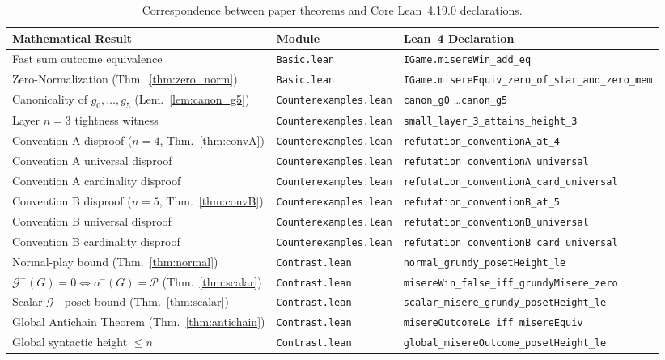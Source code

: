 \documentclass[11pt]{amsart}
\theoremstyle{definition}
\theoremstyle{remark}
\newcommand{\Ppos}{\mathcal{P}}
\newcommand{\Glayer}{\mathcal{G}}
\begin{document}
\begin{table}[ht]
\centering
\caption{Correspondence between paper theorems and Core Lean~4.19.0 declarations.}
\label{tab:lean}
\scriptsize
\setlength{\tabcolsep}{4pt}
\begin{tabular}{@{}lll@{}}
\toprule
Mathematical Result & Module & Lean~4 Declaration \\
\midrule
Fast sum outcome equivalence & \texttt{Basic.lean} & \texttt{IGame.misereWin\_add\_eq} \\
Zero-Normalization (Thm.~\ref{thm:zero_norm}) & \texttt{Basic.lean} & \texttt{IGame.misereEquiv\_zero\_of\_star\_and\_zero\_mem} \\
Canonicality of $g_0, \dots, g_5$ (Lem.~\ref{lem:canon_g5}) & \texttt{Counterexamples.lean} & \texttt{canon\_g0} \dots \texttt{canon\_g5} \\
Layer $n=3$ tightness witness & \texttt{Counterexamples.lean} & \texttt{small\_layer\_3\_attains\_height\_3} \\
Convention A disproof ($n=4$, Thm.~\ref{thm:convA}) & \texttt{Counterexamples.lean} & \texttt{refutation\_conventionA\_at\_4} \\
Convention A universal disproof & \texttt{Counterexamples.lean} & \texttt{refutation\_conventionA\_universal} \\
Convention A cardinality disproof & \texttt{Counterexamples.lean} & \texttt{refutation\_conventionA\_card\_universal} \\
Convention B disproof ($n=5$, Thm.~\ref{thm:convB}) & \texttt{Counterexamples.lean} & \texttt{refutation\_conventionB\_at\_5} \\
Convention B universal disproof & \texttt{Counterexamples.lean} & \texttt{refutation\_conventionB\_universal} \\
Convention B cardinality disproof & \texttt{Counterexamples.lean} & \texttt{refutation\_conventionB\_card\_universal} \\
Normal-play bound (Thm.~\ref{thm:normal}) & \texttt{Contrast.lean} & \texttt{normal\_grundy\_posetHeight\_le} \\
$\Glayer^-(G) = 0 \iff o^-(G) = \Ppos$ (Thm.~\ref{thm:scalar}) & \texttt{Contrast.lean} & \texttt{misereWin\_false\_iff\_grundyMisere\_zero} \\
Scalar $\Glayer^-$ poset bound (Thm.~\ref{thm:scalar}) & \texttt{Contrast.lean} & \texttt{scalar\_misere\_grundy\_posetHeight\_le} \\
Global Antichain Theorem (Thm.~\ref{thm:antichain}) & \texttt{Contrast.lean} & \texttt{misereOutcomeLe\_iff\_misereEquiv} \\
Global syntactic height $\le n$ & \texttt{Contrast.lean} & \texttt{global\_misereOutcome\_posetHeight\_le} \\
\bottomrule
\end{tabular}
\end{table}
\end{document}
